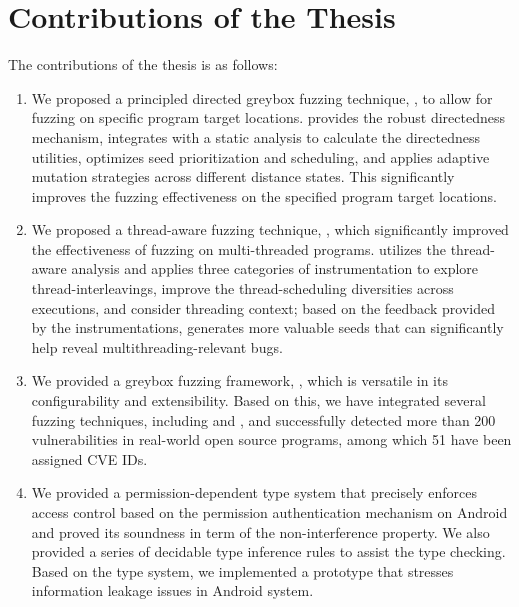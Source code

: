 \section{Contributions of the Thesis}
The contributions of the thesis is as follows:
\begin{enumerate}
	\item We proposed a principled directed greybox fuzzing technique, \dFOT, to allow for fuzzing on specific program target locations. \dFOT provides the robust directedness mechanism, integrates with a static analysis to calculate the directedness utilities, optimizes seed prioritization and scheduling, and applies adaptive mutation strategies across different distance states. This significantly improves the fuzzing effectiveness on the specified program target locations.
	\item We proposed a thread-aware fuzzing technique, \mtfuzz, which significantly improved the effectiveness of fuzzing on multi-threaded programs. \mtfuzz utilizes the thread-aware analysis and applies three categories of instrumentation to explore thread-interleavings,  improve the thread-scheduling diversities across executions, and consider threading context; based on the feedback provided by the instrumentations, \mtfuzz generates more valuable seeds that can significantly help reveal multithreading-relevant bugs.
	\item We provided a greybox fuzzing framework, \FOT, which is versatile in its configurability and extensibility. Based on this, we have integrated several fuzzing techniques, including \dFOT and \mtfuzz, and successfully detected more than 200 vulnerabilities in real-world open source programs, among which 51 have been assigned CVE IDs.
	\item We provided a permission-dependent type system that precisely enforces access control based on the permission authentication mechanism on Android and proved its soundness in term of the non-interference property. We also provided a series of decidable type inference rules to assist the type checking. Based on the type system, we implemented a prototype that stresses information leakage issues in Android system.
\end{enumerate}


